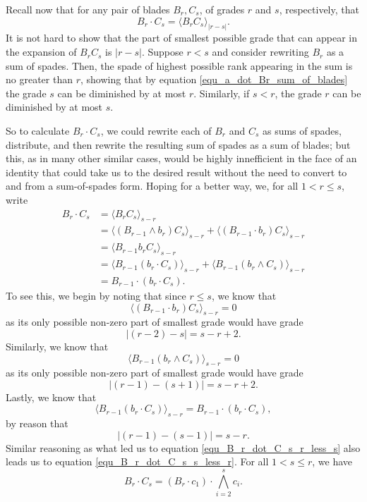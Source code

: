 \documentclass{birkjour}
\theoremstyle{definition}
\theoremstyle{remark}
\numberwithin{equation}{section}
\begin{document}
Recall now that for any pair of blades $B_r,C_s$, of grades $r$ and $s$, respectively, that
\begin{equation*}
B_r\cdot C_s = \langle B_rC_s\rangle_{|r-s|}.
\end{equation*}
It is not hard to show that the part of smallest possible grade that can appear in the expansion of $B_rC_s$ is $|r-s|$.
Suppose $r<s$ and consider rewriting $B_r$ as a sum of spades.  Then, the
spade of highest possible rank appearing in the sum is no greater than $r$, showing that by equation \eqref{equ_a_dot_Br_sum_of_blades}
the grade $s$ can be diminished by at most $r$.  Similarly, if $s<r$, the grade $r$ can be diminished by at most $s$.

So to calculate $B_r\cdot C_s$, we could rewrite each of $B_r$ and $C_s$ as sums of spades, distribute, and
then rewrite the resulting sum of spades as a sum of blades; but this, as in many other similar cases, would be highly innefficient in the face of
an identity that could take us to the desired result without the need to convert to and from a sum-of-spades form.
Hoping for a better way, we, for all $1<r\leq s$, write
\begin{align}
B_r\cdot C_s &= \langle B_rC_s\rangle_{s-r}\nonumber \\
 &= \langle (B_{r-1}\wedge b_r)C_s\rangle_{s-r} + \langle (B_{r-1}\cdot b_r)C_s\rangle_{s-r}\nonumber \\
 &= \langle B_{r-1}b_rC_s\rangle_{s-r}\nonumber \\
 &= \langle B_{r-1}(b_r\cdot C_s)\rangle_{s-r} + \langle B_{r-1}(b_r\wedge C_s)\rangle_{s-r}\nonumber \\
 &= B_{r-1}\cdot(b_r\cdot C_s).\label{equ_B_r_dot_C_s_r_less_s}
\end{align}
To see this, we begin by noting that since $r\leq s$, we know that
\begin{equation*}
\langle(B_{r-1}\cdot b_r)C_s\rangle_{s-r}=0
\end{equation*}
as its only possible non-zero part of smallest grade would have grade
\begin{equation*}
|(r-2)-s|=s-r+2.
\end{equation*}
Similarly, we know that
\begin{equation*}
\langle B_{r-1}(b_r\wedge C_s)\rangle_{s-r}=0
\end{equation*}
as its only possible non-zero part of smallest grade would have grade
\begin{equation*}
|(r-1)-(s+1)| = s-r+2.
\end{equation*}
Lastly, we know that
\begin{equation*}
\langle B_{r-1}(b_r\cdot C_s)\rangle_{s-r} = B_{r-1}\cdot(b_r\cdot C_s),
\end{equation*}
by reason that
\begin{equation*}
|(r-1)-(s-1)|=s-r.
\end{equation*}
Similar reasoning as what led us to equation \eqref{equ_B_r_dot_C_s_r_less_s} also leads us to equation \eqref{equ_B_r_dot_C_s_s_less_r}.
For all $1<s\leq r$, we have
\begin{equation}\label{equ_B_r_dot_C_s_s_less_r}
B_r\cdot C_s = (B_r\cdot c_1)\cdot\bigwedge_{i=2}^s c_i.
\end{equation}
\end{document}
